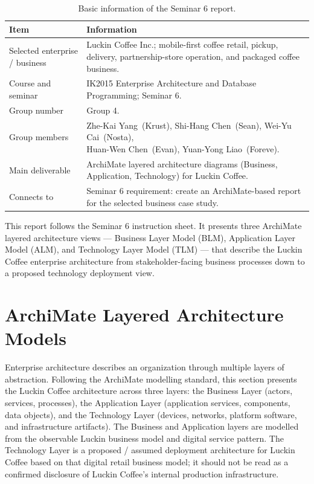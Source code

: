 \documentclass[12pt,a4paper]{article}
\begin{document}
\begin{table}[H]
\centering
\caption{Basic information of the Seminar 6 report.}
\begin{tabularx}{\textwidth}{P{4.25cm}Y}
\toprule
\textbf{Item} & \textbf{Information} \\
\midrule
Selected enterprise / business & Luckin Coffee Inc.; mobile-first coffee retail, pickup, delivery, partnership-store operation, and packaged coffee business. \\
Course and seminar & IK2015 Enterprise Architecture and Database Programming; Seminar 6. \\
Group number & Group 4. \\
Group members & \parbox[t]{\hsize}{\raggedright Zhe-Kai Yang~(Krust), Shi-Hang Chen~(Sean), Wei-Yu Cai~(Nosta),\\ Huan-Wen Chen~(Evan), Yuan-Yong Liao~(Foreve).} \\
Main deliverable & ArchiMate layered architecture diagrams (Business, Application, Technology) for Luckin Coffee. \\
Connects to & Seminar 6 requirement: create an ArchiMate-based report for the selected business case study. \\
\bottomrule
\end{tabularx}
\end{table}

This report follows the Seminar 6 instruction sheet. It presents three Archi\-Mate layered architecture views --- Business Layer Model (BLM), Application Layer Model (ALM), and Technology Layer Model (TLM) --- that describe the Luckin Coffee enterprise architecture from stakeholder-facing business processes down to a proposed technology deployment view.

\section{ArchiMate Layered Architecture Models}

Enterprise architecture describes an organization through multiple layers of abstraction. Following the ArchiMate modelling standard, this section presents the Luckin Coffee architecture across three layers: the Business Layer (actors, services, processes), the Application Layer (application services, components, data objects), and the Technology Layer (devices, networks, platform software, and infrastructure artifacts). The Business and Application layers are modelled from the observable Luckin business model and digital service pattern. The Technology Layer is a proposed / assumed deployment architecture for Luckin Coffee based on that digital retail business model; it should not be read as a confirmed disclosure of Luckin Coffee's internal production infrastructure.
\end{document}
